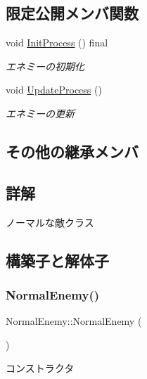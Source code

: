 \subsection*{限定公開メンバ関数}
\begin{DoxyCompactItemize}
\item 
void \mbox{\hyperlink{class_normal_enemy_ae45bd9535595f810d065b92f8dd63342}{Init\+Process}} () final
\begin{DoxyCompactList}\small\item\em エネミーの初期化 \end{DoxyCompactList}\item 
void \mbox{\hyperlink{class_normal_enemy_a9f66e4bf18310ec7c5dc679bea78fa8e}{Update\+Process}} ()
\begin{DoxyCompactList}\small\item\em エネミーの更新 \end{DoxyCompactList}\end{DoxyCompactItemize}
\subsection*{その他の継承メンバ}


\subsection{詳解}
ノーマルな敵クラス 

\subsection{構築子と解体子}
\mbox{\label{class_normal_enemy_aa386eea59a2983574fe7d55a91f93012}} 
\subsubsection{\texorpdfstring{Normal\+Enemy()}{NormalEnemy()}\hspace{0.1cm}{\footnotesize\ttfamily [1/3]}}
{\footnotesize\ttfamily Normal\+Enemy\+::\+Normal\+Enemy (\begin{DoxyParamCaption}{ }\end{DoxyParamCaption})\hspace{0.3cm}{\ttfamily [inline]}}



コンストラクタ 

